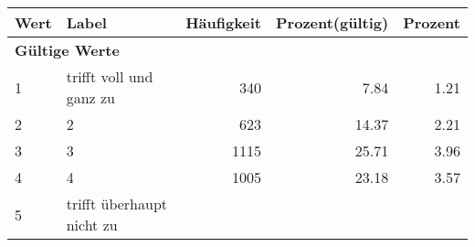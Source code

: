      \begin{longtable}{lXrrr}
     \toprule
     \textbf{Wert} & \textbf{Label} & \textbf{Häufigkeit} & \textbf{Prozent(gültig)} & \textbf{Prozent} \\
     \endhead
     \midrule
     \multicolumn{5}{l}{\textbf{Gültige Werte}}\\

     1 &
     \multicolumn{1}{X}{ trifft voll und ganz zu   } &


       \num{340} &
       \num[round-mode=places,round-precision=2]{7.84} &
         \num[round-mode=places,round-precision=2]{1.21} \\

     2 &
     \multicolumn{1}{X}{ 2   } &


       \num{623} &
       \num[round-mode=places,round-precision=2]{14.37} &
         \num[round-mode=places,round-precision=2]{2.21} \\

     3 &
     \multicolumn{1}{X}{ 3   } &


       \num{1115} &
       \num[round-mode=places,round-precision=2]{25.71} &
         \num[round-mode=places,round-precision=2]{3.96} \\

     4 &
     \multicolumn{1}{X}{ 4   } &


       \num{1005} &
       \num[round-mode=places,round-precision=2]{23.18} &
         \num[round-mode=places,round-precision=2]{3.57} \\

     5 &
     \multicolumn{1}{X}{ trifft überhaupt nicht zu   } &



\end{longtable}
